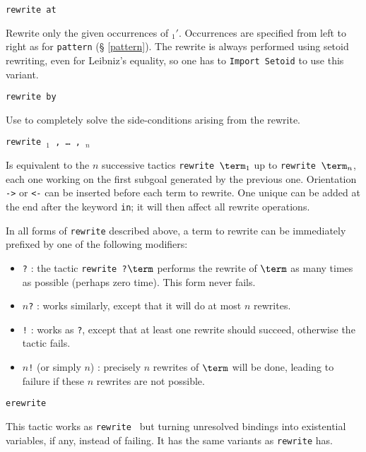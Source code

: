 \begin{coq_example*}
\begin{Variants}
\item {\tt rewrite {\term} at {\occlist}}

  Rewrite only the given occurrences of \term$_1'$. Occurrences are
  specified from left to right as for \texttt{pattern} (\S
  \ref{pattern}). The rewrite is always performed using setoid
  rewriting, even for Leibniz's equality, so one has to
  \texttt{Import Setoid} to use this variant.

\item {\tt rewrite {\term} by {\tac}}

  Use {\tac} to completely solve the side-conditions arising from the
  rewrite.

\item {\tt rewrite \term$_1$ , \mbox{\dots} , \term$_n$}

  Is equivalent to the $n$ successive tactics {\tt rewrite $\term_1$}
  up to {\tt rewrite $\term_n$}, each one working on the first subgoal
  generated by the previous one.
  Orientation {\tt ->} or {\tt <-} can be
  inserted before each term to rewrite. One unique 
  can be added at the end after the keyword {\tt in}; it will
  then affect all rewrite operations.

\item In all forms of {\tt rewrite} described above, a term to rewrite
  can be immediately prefixed by one of the following modifiers:
  \begin{itemize}
  \item {\tt ?} : the tactic {\tt rewrite ?$\term$} performs the
    rewrite of $\term$  as many times as possible (perhaps zero time).
    This form never fails.
  \item {\tt $n$?} : works similarly, except that it will do at most
   $n$ rewrites.
  \item {\tt !} : works as {\tt ?}, except that at least one rewrite
    should succeed, otherwise the tactic fails.
  \item {\tt $n$!} (or simply {\tt $n$}) : precisely $n$ rewrites
    of $\term$ will be done, leading to failure if these $n$ rewrites are not possible.
  \end{itemize}

\item {\tt erewrite {\term}}

This tactic works as {\tt rewrite {\term}} but turning unresolved
bindings into existential variables, if any, instead of failing. It has
the same variants as {\tt rewrite} has.


\end{Variants}
\end{coq_example*}
